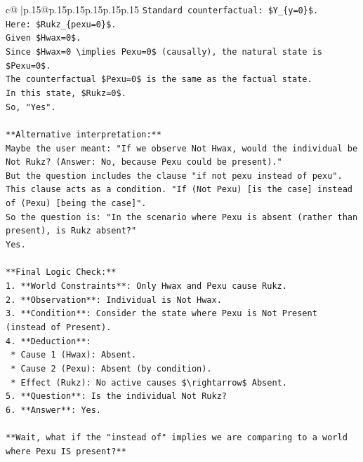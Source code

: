 \documentclass{article}
\begin{document}
{\begin{supertabular}{c@{$\;$}|p{.15\linewidth}@{}p{.15\linewidth}p{.15\linewidth}p{.15\linewidth}p{.15\linewidth}p{.15\linewidth}}
{{{\texttt{Standard counterfactual: \$Y\_\{y=0\}\$.} \\
\texttt{Here: \$Rukz\_\{pexu=0\}\$.} \\
\texttt{Given \$Hwax=0\$.} \\
\texttt{Since \$Hwax=0 \textbackslash{}implies Pexu=0\$ (causally), the natural state is \$Pexu=0\$.} \\
\texttt{The counterfactual \$Pexu=0\$ is the same as the factual state.} \\
\texttt{In this state, \$Rukz=0\$.} \\
\texttt{So, "Yes".} \\
\\ 
\texttt{**Alternative interpretation:**} \\
\texttt{Maybe the user meant: "If we observe Not Hwax, would the individual be Not Rukz? (Answer: No, because Pexu could be present)."} \\
\texttt{But the question includes the clause "if not pexu instead of pexu".} \\
\texttt{This clause acts as a condition. "If (Not Pexu) {[}is the case{]} instead of (Pexu) {[}being the case{]}".} \\
\texttt{So the question is: "In the scenario where Pexu is absent (rather than present), is Rukz absent?"} \\
\texttt{Yes.} \\
\\ 
\texttt{**Final Logic Check:**} \\
\texttt{1.  **World Constraints**: Only Hwax and Pexu cause Rukz.} \\
\texttt{2.  **Observation**: Individual is Not Hwax.} \\
\texttt{3.  **Condition**: Consider the state where Pexu is Not Present (instead of Present).} \\
\texttt{4.  **Deduction**:} \\
\texttt{    *   Cause 1 (Hwax): Absent.} \\
\texttt{    *   Cause 2 (Pexu): Absent (by condition).} \\
\texttt{    *   Effect (Rukz): No active causes \$\textbackslash{}rightarrow\$ Absent.} \\
\texttt{5.  **Question**: Is the individual Not Rukz?} \\
\texttt{6.  **Answer**: Yes.} \\
\\ 
\texttt{**Wait, what if the "instead of" implies we are comparing to a world where Pexu IS present?**} \\
}}}
\end{supertabular}}
\end{document}
